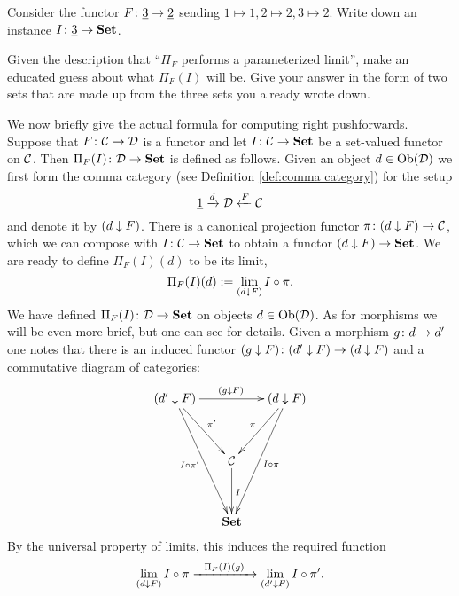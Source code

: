 \documentclass[CT4S-EN-RU]{subfiles}
\begin{document}
\begin{exercise}
Consider the functor $F\colon\underline{3}\rightarrow\underline{2}$ sending $1\mapsto 1, 2\mapsto 2, 3\mapsto 2$.
\sexc Write down an instance $I\colon\underline{3}\rightarrow{\bf Set}$.
\item Given the description that “$\Pi_F$ performs a parameterized limit”, make an educated guess about what $\Pi_F(I)$ will be. Give your answer in the form of two sets that are made up from the three sets you already wrote down.
\endsexc
\end{exercise}

We now briefly give the actual formula for computing right pushforwards. Suppose that $F\colon\mathcal{C}\rightarrow\mathcal{D}$ is a functor and let $I\colon\mathcal{C}\rightarrow{\bf Set}$ be a set-valued functor on $\mathcal{C}$. Then $\Pi_F(I)\colon\mathcal{D}\rightarrow{\bf Set}$ is defined as follows. Given an object $d\in\textnormal{Ob}(\mathcal{D})$ we first form the comma category (see Definition \ref{def:comma category}) for the setup
$$\underline{1}\xrightarrow{d}\mathcal{D}\xleftarrow{F}\mathcal{C}$$
and denote it by $(d\downarrow F)$. There is a canonical projection functor $\pi\colon(d\downarrow F)\rightarrow\mathcal{C}$, which we can compose with $I\colon\mathcal{C}\rightarrow{\bf Set}$ to obtain a functor $(d\downarrow F)\rightarrow{\bf Set}$. We are ready to define $\Pi_F(I)(d)$ to be its limit,
$$\Pi_F(I)(d):=\lim_{(d\downarrow F)}I\circ\pi.$$
We have defined $\Pi_F(I)\colon\mathcal{D}\rightarrow{\bf Set}$ on objects $d\in\textnormal{Ob}(\mathcal{D})$. As for morphisms we will be even more brief, but one can see \cite{Sp1} for details. Given a morphism $g\colon d\rightarrow d'$ one notes that there is an induced functor $(g\downarrow F)\colon (d'\downarrow F)\rightarrow(d\downarrow F)$ and a commutative diagram of categories:
$$
\xymatrix@=15pt{
(d'\down F)\ar[rr]^{(g\down F)}\ar[ddr]^{\pi'}\ar[ddddr]_{I\circ\pi'}&&(d\down F)\ar[ddl]_{\pi}\ar[ddddl]^{I\circ\pi}\\\\
&\mcC\ar[dd]^I\\\\
&\Set
}
$$
By the universal property of limits, this induces the required function $$\lim_{(d\downarrow F)}I\circ\pi\xrightarrow{\ \ \Pi_F(I)(g)\ \ }\lim_{(d'\downarrow F)}I\circ\pi'.$$
\end{document}
